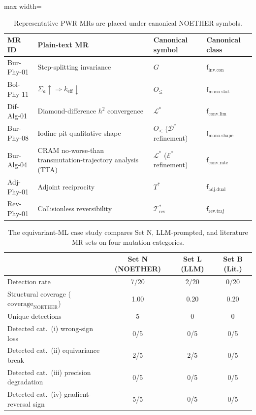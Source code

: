 \documentclass[manuscript]{acmart}
\begin{document}
\begin{table}[h]
\centering
\caption{Representative PWR MRs are placed under canonical NOETHER symbols.}
\label{tab:elementwise}
\footnotesize
\begin{adjustbox}{max width=\textwidth}
\begin{tabular}{llll}
\toprule
\textbf{MR ID} & \textbf{Plain-text MR} & \textbf{Canonical symbol} & \textbf{Canonical class} \\
\midrule
Bur-Phy-01 & Step-splitting invariance & $G$ & $\mathsf{f}_{\mathrm{inv}.\mathrm{con}}$ \\
Bol-Phy-11 & $\Sigma_a\!\uparrow \Rightarrow k_{\mathrm{eff}}\!\downarrow$ & $O_{\le}$ & $\mathsf{f}_{\mathrm{mono}.\mathrm{stat}}$ \\
Dif-Alg-01 & Diamond-difference $h^2$ convergence & $\mathcal{L}^{*}$ & $\mathsf{f}_{\mathrm{conv}.\mathrm{lim}}$ \\
Bur-Phy-08 & Iodine pit qualitative shape & $O_{\le}$ ($\mathcal{D}^{*}$ refinement) & $\mathsf{f}_{\mathrm{mono}.\mathrm{shape}}$ \\
Bur-Alg-04 & CRAM no-worse-than transmutation-trajectory analysis (TTA) & $\mathcal{L}^{*}$ ($\mathcal{E}^{*}$ refinement) & $\mathsf{f}_{\mathrm{conv}.\mathrm{rate}}$ \\
Adj-Phy-01 & Adjoint reciprocity & $T^{*}$ & $\mathsf{f}_{\mathrm{adj}.\mathrm{dual}}$ \\
Rev-Phy-01 & Collisionless reversibility & $\mathcal{T}^{*}_{\mathrm{rev}}$ & $\mathsf{f}_{\mathrm{rev}.\mathrm{traj}}$ \\
\bottomrule
\end{tabular}
\end{adjustbox}
\end{table}

\begin{table}[h]
\centering
\caption{The equivariant-ML case study compares Set N, LLM-prompted, and literature MR sets on four mutation categories.}
\label{tab:case-study}
\small
\begin{tabular}{lccc}
\toprule
& Set N (NOETHER) & Set L (LLM) & Set B (Lit.) \\
\midrule
Detection rate & 7/20 & 2/20 & 0/20 \\
Structural coverage ($\mathrm{coverage}_{\mathrm{NOETHER}}$) & 1.00 & 0.20 & 0.20 \\
Unique detections & 5 & 0 & 0 \\
Detected cat.~(i) wrong-sign loss & 0/5 & 0/5 & 0/5 \\
Detected cat.~(ii) equivariance break & 2/5 & 2/5 & 0/5 \\
Detected cat.~(iii) precision degradation & 0/5 & 0/5 & 0/5 \\
Detected cat.~(iv) gradient-reversal sign & 5/5 & 0/5 & 0/5 \\
\bottomrule
\end{tabular}
\end{table}
\end{document}
